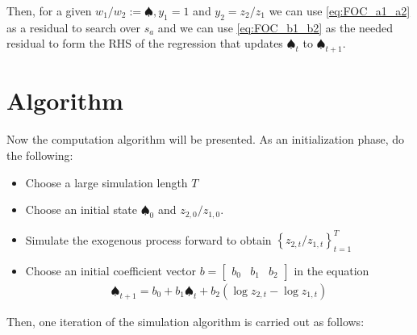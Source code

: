 \documentclass[19pt]{article}
\begin{document}
Then, for a given $w_1/w_2 := \spadesuit, y_1=1$ and $y_2=z_2/z_1$ we can use \eqref{eq:FOC_a1_a2} as a residual to search over $s_a$ and we can use \eqref{eq:FOC_b1_b2} as the needed residual to form the RHS of the regression that updates $\spadesuit_t$ to $\spadesuit_{t+1}$.

\section{Algorithm} \label{sec:Algorithm}

Now the computation algorithm will be presented. As an initialization phase, do the following:

\begin{itemize}
  \item Choose a large simulation length $T$
  \item Choose an initial state $\spadesuit_0$ and $z_{2,0}/z_{1,0}$.
  \item Simulate the exogenous process forward to obtain $\left\{z_{2,t}/z_{1,t}  \right\}_{t=1}^T$
  \item Choose an initial coefficient vector $b = \begin{bmatrix}b_0 & b_1 & b_2\end{bmatrix}$ in the equation
  \begin{align*}
    \spadesuit_{t+1} = b_0 + b_1 \spadesuit_t + b_2 (\log z_{2,t} - \log z_{1,t})
  \end{align*}
\end{itemize}


Then, one iteration of the simulation algorithm is carried out as follows:
\end{document}

